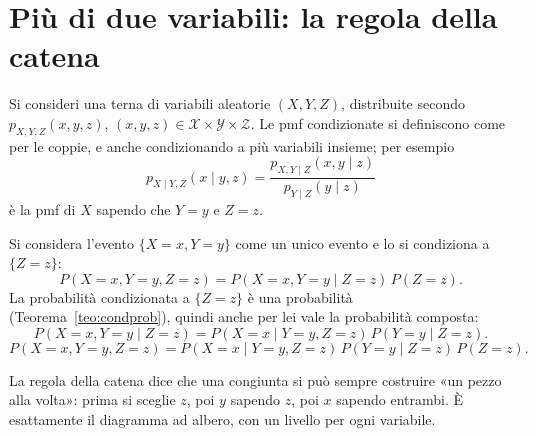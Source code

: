 \section{Più di due variabili: la regola della catena}

Si consideri una terna di variabili aleatorie $(X, Y, Z)$, distribuite secondo $p_{X,Y,Z}(x, y, z)$,
$(x, y, z) \in \mathcal{X} \times \mathcal{Y} \times \mathcal{Z}$. Le pmf condizionate si definiscono come per le
coppie, e anche condizionando a più variabili insieme; per esempio
\[ p_{X \mid Y,Z}(x \mid y, z) = \frac{p_{X,Y \mid Z}(x, y \mid z)}{p_{Y \mid Z}(y \mid z)} \]
è la pmf di $X$ sapendo che $Y = y$ e $Z = z$.


\begin{dimostrazione}
 Si considera l'evento $\{X = x, Y = y\}$ come un unico evento e
lo si condiziona a $\{Z = z\}$:
\[ P(X = x, Y = y, Z = z) = P(X = x, Y = y \mid Z = z)\, P(Z = z) . \]
 La probabilità condizionata a $\{Z = z\}$ è una probabilità
(Teorema~\ref{teo:condprob}), quindi anche per lei vale la probabilità composta:
\[ P(X = x, Y = y \mid Z = z) = P(X = x \mid Y = y, Z = z)\, P(Y = y \mid Z = z) . \]
\[ P(X = x, Y = y, Z = z) = P(X = x \mid Y = y, Z = z)\, P(Y = y \mid Z = z)\, P(Z = z) . \]
\end{dimostrazione}

La regola della catena dice che una congiunta si può sempre costruire «un pezzo alla volta»: prima si sceglie $z$, poi
$y$ sapendo $z$, poi $x$ sapendo entrambi. È esattamente il diagramma ad albero, con un livello per ogni variabile.


